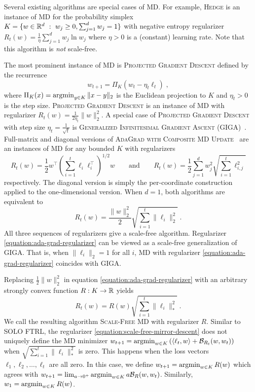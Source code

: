 Several existing algorithms are special cases of \textsc{MD}.  For example,
\textsc{Hedge} is an instance of \textsc{MD} for the probability simplex $K =
\{ w \in \mathbb{R}^d ~:~ w_j \ge 0, \sum_{j=1}^d w_j = 1 \}$ with negative entropy
regularizer $R_t(w) = \frac{1}{\eta} \sum_{j=1}^d w_j \ln w_j$ where $\eta > 0$
is a (constant) learning rate. Note that this algorithm is \emph{not}
scale-free.

The most prominent instance of \textsc{MD} is \textsc{Projected Gradient
Descent} defined by the recurrence
$$
w_{t+1} = \Pi_K \left( w_t - \eta_t \ell_t \right) \; ,
$$
where $\Pi_K(x) = \operatorname*{argmin}_{y \in K} \|x-y\|_2$ is the Euclidean projection to
$K$ and $\eta_t > 0$ is the step size.  \textsc{Projected Gradient Descent} is
an instance of \textsc{MD} with regularizer $R_t(w) =
\frac{1}{2\eta_t}\|w\|_2^2$.  A special case of \textsc{Projected Gradient
Descent} with step size $\eta_t = \frac{1}{\sqrt{t}}$ is \textsc{Generalized
Infinitesimal Gradient Ascent} (GIGA)~\cite{Zinkevich-2003}.  Full-matrix and
diagonal versions of \textsc{AdaGrad with Composite MD
Update}~\cite{Duchi-Hazan-Singer-2011} are an instances of \textsc{MD} for any
bounded $K$ with regularizers
$$
R_t(w) = \frac{1}{2} w^\top \left(\sum_{i=1}^t \ell_i \ell_i^\top \right)^{1/2} \!\!\!\! w
\qquad \text{and} \qquad
R_t(w) = \frac{1}{2} \sum_{j=1}^d w_j^2 \sqrt{ \sum_{i=1}^t \ell_{i,j}^2}
$$
respectively. The diagonal version is simply the per-coordinate construction
applied to the one-dimensional version. When $d=1$, both algorithms are
equivalent to
\begin{equation}
\label{equation:ada-grad-regularizer}
R_t(w) = \frac{\|w\|_2^2}{2} \sqrt{\sum_{i=1}^t \|\ell_i\|_2^2 } \; .
\end{equation}
All three sequences of regularizers give a scale-free algorithm. Regularizer
\eqref{equation:ada-grad-regularizer} can be viewed as a scale-free
generalization of GIGA. That is, when $\|\ell_i\|_2
= 1$ for all $i$, \textsc{MD} with regularizer
\eqref{equation:ada-grad-regularizer} coincides with GIGA.

Replacing $\frac{1}{2}\|w\|_2^2$ in equation
\eqref{equation:ada-grad-regularizer} with an arbitrary strongly convex
function $R:K \to \mathbb{R}$ yields
\begin{equation}
\label{equation:scale-free-mirror-descent}
R_t(w) = R(w) \sqrt{\sum_{i=1}^t \|\ell_i\|_*^2} \; .
\end{equation}
We call the resulting algorithm \textsc{Scale-Free MD} with
regularizer $R$. Similar to \textsc{SOLO FTRL}, the regularizer
\eqref{equation:scale-free-mirror-descent} does not uniquely define
the \textsc{MD} minimizer
$w_{t+1} = \operatorname*{argmin}_{w \in K} \left(\langle \ell_t, w \rangle + \mathcal{B}_{R_t}(w,
w_t) \right)$ when $\sqrt{\sum_{i=1}^t \|\ell_i\|_*^2}$ is zero.
This happens when the loss vectors $\ell_1, \ell_2, \dots, \ell_t$ are all
zero. In this case, we define
$w_{t+1} = \operatorname*{argmin}_{w \in K} R(w)$ which agrees with
$w_{t+1} = \lim_{a \to 0^+} \operatorname*{argmin}_{w \in K} a \mathcal{B}_{R}(w, w_t)$.
Similarly, $w_1 = \operatorname*{argmin}_{w \in K} R(w)$.

